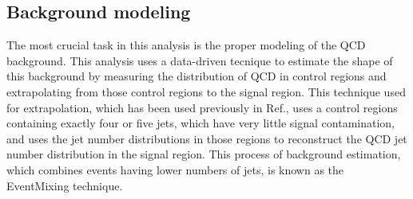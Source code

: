 



\subsection{Background modeling}
\label{sec:bkg}
\noindent

The most crucial task in this analysis is the proper modeling of the QCD background.
This analysis uses a data-driven tecnique to estimate the shape of this background by measuring the distribution of QCD in control regions
and extrapolating from those control regions to the signal region.
This technique used for extrapolation, which has been used previously in Ref.\cite{PhysRevD.82.032002},
uses a control regions containing exactly four or five jets, which have very little signal contamination,
and uses the jet number distributions in those regions to reconstruct the QCD jet number distribution
in the signal region.
This process of background estimation, which combines events having lower numbers of jets, is known as the EventMixing technique.

